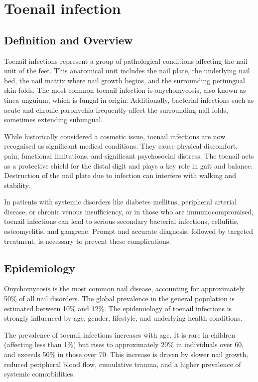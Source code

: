 \chapter{Toenail infection}

\section*{Definition and Overview}
Toenail infections represent a group of pathological conditions affecting the nail unit of the feet. This anatomical unit includes the nail plate, the underlying nail bed, the nail matrix where nail growth begins, and the surrounding periungual skin folds. The most common toenail infection is onychomycosis, also known as tinea unguium, which is fungal in origin. Additionally, bacterial infections such as acute and chronic paronychia frequently affect the surrounding nail folds, sometimes extending subungual.

While historically considered a cosmetic issue, toenail infections are now recognised as significant medical conditions. They cause physical discomfort, pain, functional limitations, and significant psychosocial distress. The toenail acts as a protective shield for the distal digit and plays a key role in gait and balance. Destruction of the nail plate due to infection can interfere with walking and stability.

In patients with systemic disorders like diabetes mellitus, peripheral arterial disease, or chronic venous insufficiency, or in those who are immunocompromised, toenail infections can lead to serious secondary bacterial infections, cellulitis, osteomyelitis, and gangrene. Prompt and accurate diagnosis, followed by targeted treatment, is necessary to prevent these complications.

\section*{Epidemiology}
Onychomycosis is the most common nail disease, accounting for approximately 50\% of all nail disorders. The global prevalence in the general population is estimated between 10\% and 12\%. The epidemiology of toenail infections is strongly influenced by age, gender, lifestyle, and underlying health conditions.

The prevalence of toenail infections increases with age. It is rare in children (affecting less than 1\%) but rises to approximately 20\% in individuals over 60, and exceeds 50\% in those over 70. This increase is driven by slower nail growth, reduced peripheral blood flow, cumulative trauma, and a higher prevalence of systemic comorbidities.

